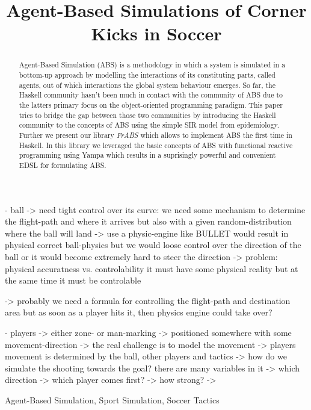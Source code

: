 \documentclass[10pt, conference]{../../templates/IEEEtran/IEEEtran}
\title{Agent-Based Simulations of Corner Kicks in Soccer}
\author{
	\IEEEauthorblockN{Jonathan Thaler}
	\IEEEauthorblockA{School of Computer Science\\
		University of Nottingham\\
		jonathan.thaler@nottingham.ac.uk}
}
\begin{document}
\maketitle 

- ball
	-> need tight control over its curve: we need some mechanism to determine the flight-path and where it arrives
		but also with a given random-distribution where the ball will land
	-> use a physic-engine like BULLET would result in physical correct ball-physics but we would loose control over the direction of the ball or it would become extremely hard to steer the direction
	-> problem: physical accuratness vs. controlability
		it must have some physical reality but at the same time it must be controlable
		
	-> probably we need a formula for controlling the flight-path and destination area but
		as soon as a player hits it, then physics engine could take over?

- players
	-> either zone- or man-marking
	-> positioned somewhere with some movement-direction 
	-> the real challenge is to model the movement
		-> players movement is determined by the ball, other players and tactics
	-> how do we simulate the shooting towards the goal? there are many variables in it
		-> which direction
		-> which player comes first?
		-> how strong?
		-> 

\begin{abstract}
Agent-Based Simulation (ABS) is a methodology in which a system is simulated in a bottom-up approach by modelling the interactions of its constituting parts, called agents, out of which interactions the global system behaviour emerges. So far, the Haskell community hasn't been much in contact with the community of ABS due to the latters primary focus on the object-oriented programming paradigm. This paper tries to bridge the gap between those two communities by introducing the Haskell community to the concepts of ABS using the simple SIR model from epidemiology. Further we present our library \textit{FrABS} which allows to implement ABS the first time in Haskell. In this library we leveraged the basic concepts of ABS with functional reactive programming using Yampa which results in a suprisingly powerful and convenient EDSL for formulating ABS.
\end{abstract}

\begin{IEEEkeywords}
Agent-Based Simulation, Sport Simulation, Soccer Tactics
\end{IEEEkeywords}



\end{document}
